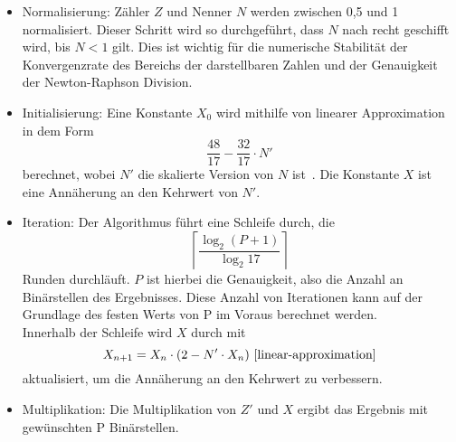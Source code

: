 \documentclass[course=erap]{aspdoc}
\begin{document}
\begin{itemize}
    \item Normalisierung: Zähler $Z$ und Nenner $N$ werden zwischen 0,5 und 1 normalisiert.
    Dieser Schritt wird so durchgeführt, dass $N$ nach recht geschifft wird, bis $N < 1$ gilt. Dies ist wichtig 
    für die numerische Stabilität der Konvergenzrate des Bereichs der darstellbaren Zahlen 
    und der Genauigkeit der Newton-Raphson Division. 
    
    \item Initialisierung: Eine Konstante $X_0$ wird mithilfe von linearer Approximation in dem Form     
    \begin{equation*}
        \frac{48}{17}- \frac{32}{17} \cdot N'
    \end{equation*} 
    berechnet, wobei $N'$ die skalierte Version von $N$ ist~\cite{linear-approximation}. 
    Die Konstante $X$ ist eine Annäherung an den Kehrwert von $N'$.
    
    \item Iteration: Der Algorithmus führt eine Schleife durch, die 
    \begin{equation*}
        \left\lceil \frac{\log_{2}{(P+1)}}{\log_{2}17} \right\rceil
    \end{equation*}
    Runden durchläuft. $P$ ist hierbei die Genauigkeit, also die Anzahl an Binärstellen des Ergebnisses. Diese Anzahl von Iterationen kann auf der Grundlage des festen Werts von P im Voraus berechnet werden.\\
    Innerhalb der Schleife wird $X$ durch mit  
    \begin{equation*}
        X_{n+1} = X_n \cdot (2 - N' \cdot X_n)~\cite{linear-approximation}
    \end{equation*}
     aktualisiert, um die Annäherung an den Kehrwert zu 
    verbessern.
    
   \item Multiplikation: Die Multiplikation von $Z'$ und $X$ ergibt das Ergebnis mit gewünschten P Binärstellen.
\end{itemize}
\end{document}
